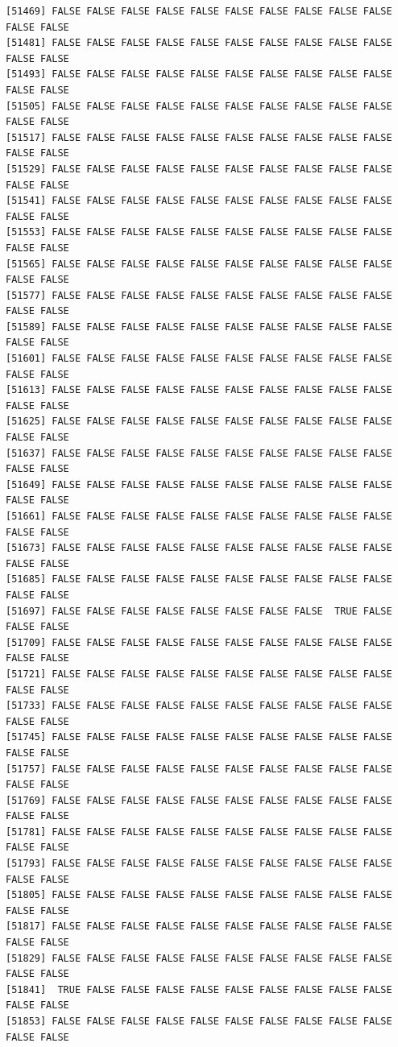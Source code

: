 \documentclass[
  a4paper,
  DIV=11,
  numbers=noendperiod]{scrartcl}
\begin{document}
\begin{verbatim}
[51469] FALSE FALSE FALSE FALSE FALSE FALSE FALSE FALSE FALSE FALSE FALSE FALSE
[51481] FALSE FALSE FALSE FALSE FALSE FALSE FALSE FALSE FALSE FALSE FALSE FALSE
[51493] FALSE FALSE FALSE FALSE FALSE FALSE FALSE FALSE FALSE FALSE FALSE FALSE
[51505] FALSE FALSE FALSE FALSE FALSE FALSE FALSE FALSE FALSE FALSE FALSE FALSE
[51517] FALSE FALSE FALSE FALSE FALSE FALSE FALSE FALSE FALSE FALSE FALSE FALSE
[51529] FALSE FALSE FALSE FALSE FALSE FALSE FALSE FALSE FALSE FALSE FALSE FALSE
[51541] FALSE FALSE FALSE FALSE FALSE FALSE FALSE FALSE FALSE FALSE FALSE FALSE
[51553] FALSE FALSE FALSE FALSE FALSE FALSE FALSE FALSE FALSE FALSE FALSE FALSE
[51565] FALSE FALSE FALSE FALSE FALSE FALSE FALSE FALSE FALSE FALSE FALSE FALSE
[51577] FALSE FALSE FALSE FALSE FALSE FALSE FALSE FALSE FALSE FALSE FALSE FALSE
[51589] FALSE FALSE FALSE FALSE FALSE FALSE FALSE FALSE FALSE FALSE FALSE FALSE
[51601] FALSE FALSE FALSE FALSE FALSE FALSE FALSE FALSE FALSE FALSE FALSE FALSE
[51613] FALSE FALSE FALSE FALSE FALSE FALSE FALSE FALSE FALSE FALSE FALSE FALSE
[51625] FALSE FALSE FALSE FALSE FALSE FALSE FALSE FALSE FALSE FALSE FALSE FALSE
[51637] FALSE FALSE FALSE FALSE FALSE FALSE FALSE FALSE FALSE FALSE FALSE FALSE
[51649] FALSE FALSE FALSE FALSE FALSE FALSE FALSE FALSE FALSE FALSE FALSE FALSE
[51661] FALSE FALSE FALSE FALSE FALSE FALSE FALSE FALSE FALSE FALSE FALSE FALSE
[51673] FALSE FALSE FALSE FALSE FALSE FALSE FALSE FALSE FALSE FALSE FALSE FALSE
[51685] FALSE FALSE FALSE FALSE FALSE FALSE FALSE FALSE FALSE FALSE FALSE FALSE
[51697] FALSE FALSE FALSE FALSE FALSE FALSE FALSE FALSE  TRUE FALSE FALSE FALSE
[51709] FALSE FALSE FALSE FALSE FALSE FALSE FALSE FALSE FALSE FALSE FALSE FALSE
[51721] FALSE FALSE FALSE FALSE FALSE FALSE FALSE FALSE FALSE FALSE FALSE FALSE
[51733] FALSE FALSE FALSE FALSE FALSE FALSE FALSE FALSE FALSE FALSE FALSE FALSE
[51745] FALSE FALSE FALSE FALSE FALSE FALSE FALSE FALSE FALSE FALSE FALSE FALSE
[51757] FALSE FALSE FALSE FALSE FALSE FALSE FALSE FALSE FALSE FALSE FALSE FALSE
[51769] FALSE FALSE FALSE FALSE FALSE FALSE FALSE FALSE FALSE FALSE FALSE FALSE
[51781] FALSE FALSE FALSE FALSE FALSE FALSE FALSE FALSE FALSE FALSE FALSE FALSE
[51793] FALSE FALSE FALSE FALSE FALSE FALSE FALSE FALSE FALSE FALSE FALSE FALSE
[51805] FALSE FALSE FALSE FALSE FALSE FALSE FALSE FALSE FALSE FALSE FALSE FALSE
[51817] FALSE FALSE FALSE FALSE FALSE FALSE FALSE FALSE FALSE FALSE FALSE FALSE
[51829] FALSE FALSE FALSE FALSE FALSE FALSE FALSE FALSE FALSE FALSE FALSE FALSE
[51841]  TRUE FALSE FALSE FALSE FALSE FALSE FALSE FALSE FALSE FALSE FALSE FALSE
[51853] FALSE FALSE FALSE FALSE FALSE FALSE FALSE FALSE FALSE FALSE FALSE FALSE

\end{verbatim}
\end{document}
